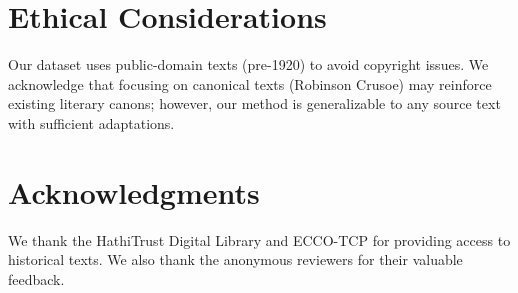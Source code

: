 \documentclass[11pt]{article}
\begin{document}
\section*{Ethical Considerations}

Our dataset uses public-domain texts (pre-1920) to avoid copyright issues. We acknowledge that focusing on canonical texts (Robinson Crusoe) may reinforce existing literary canons; however, our method is generalizable to any source text with sufficient adaptations.

\section*{Acknowledgments}

We thank the HathiTrust Digital Library and ECCO-TCP for providing access to historical texts. We also thank the anonymous reviewers for their valuable feedback.



\end{document}
